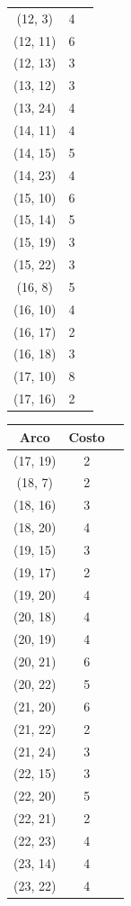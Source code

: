 \documentclass{article}
\begin{document}
\begin{table}[h!]
\begin{tabular}{ccc}
        (12, 3) & 4 \\
        (12, 11) & 6 \\
        (12, 13) & 3 \\
        (13, 12) & 3 \\
        (13, 24) & 4 \\
        (14, 11) & 4 \\
        (14, 15) & 5 \\
        (14, 23) & 4 \\
        (15, 10) & 6 \\
        (15, 14) & 5 \\
        (15, 19) & 3 \\
        (15, 22) & 3 \\
        (16, 8) & 5 \\
        (16, 10) & 4 \\
        (16, 17) & 2 \\
        (16, 18) & 3 \\
        (17, 10) & 8 \\
        (17, 16) & 2 \\
     \bottomrule
    \end{tabular}
    \begin{tabular}{ccc}
      \toprule
        Arco & Costo \\
      \midrule
        (17, 19) & 2 \\
        (18, 7) & 2 \\
        (18, 16) & 3 \\
        (18, 20) & 4 \\
        (19, 15) & 3 \\
        (19, 17) & 2 \\
        (19, 20) & 4 \\
        (20, 18) & 4 \\
        (20, 19) & 4 \\
        (20, 21) & 6 \\
        (20, 22) & 5 \\
        (21, 20) & 6 \\
        (21, 22) & 2 \\
        (21, 24) & 3 \\
        (22, 15) & 3 \\
        (22, 20) & 5 \\
        (22, 21) & 2 \\
        (22, 23) & 4 \\
        (23, 14) & 4 \\
        (23, 22) & 4 \\

\end{tabular}
\end{table}
\end{document}
